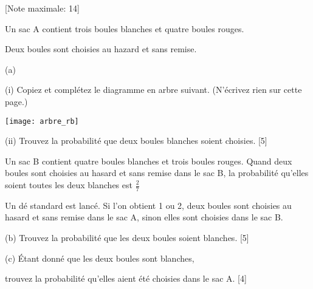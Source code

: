 \begin{question}
  \hspace*{\fill} [Note maximale: 14]\par
  \medskip
  \noindent Un sac A contient trois boules blanches et quatre boules rouges.\par
  \noindent Deux boules sont choisies au hazard et sans remise.\par
  \medskip
  (a)\par
  \hspace{1em} (i) Copiez et complétez le diagramme en arbre suivant. (N’écrivez rien sur cette page.)\par
  \texttt{[image: arbre\_rb]}\par
  \hspace{1em} (ii) Trouvez la probabilité que deux boules blanches soient choisies.\hspace*{\fill} [5]\par
  \medskip  
  \noindent Un sac B contient quatre boules blanches et trois boules rouges. Quand deux boules sont choisies au hasard et sans remise dans le sac B, la probabilité qu’elles soient toutes les deux blanches est $\frac{2}{7}$\par
  \medskip
  \noindent Un dé standard est lancé. Si l’on obtient 1 ou 2, deux boules sont choisies au hasard et sans remise dans le sac A, sinon elles sont choisies dans le sac B.\par
  \medskip
  (b) Trouvez la probabilité que les deux boules soient blanches.\hspace*{\fill} [5]\par
  \medskip
  (c) Étant donné que les deux boules sont blanches,\par
  \hspace{2em} trouvez la probabilité qu’elles aient été choisies dans le sac A.\hspace*{\fill} [4]\par
  
  
\end{question}

